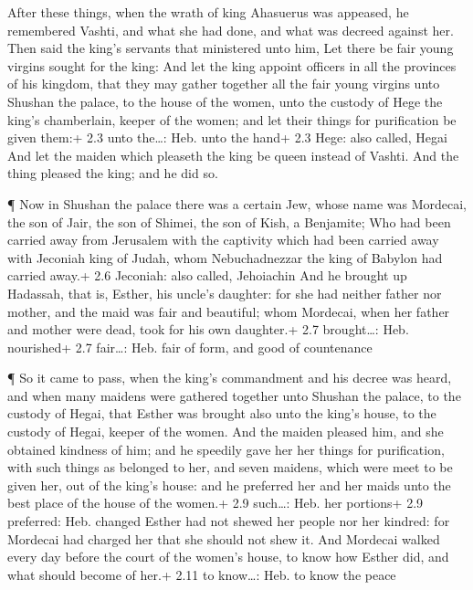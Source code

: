  After these things, when the wrath of king Ahasuerus was
appeased, he remembered Vashti, and what she had done, and what was
decreed against her.  Then said the king's servants that
ministered unto him, Let there be fair young virgins sought for the
king:  And let the king appoint officers in all the
provinces of his kingdom, that they may gather together all the fair
young virgins unto Shushan the palace, to the house of the women, unto
the custody of Hege the king's chamberlain, keeper of the women; and let
their things for purification be given them:+ 2.3 unto the\ldots: Heb.
unto the hand+ 2.3 Hege: also called, Hegai  And let the
maiden which pleaseth the king be queen instead of Vashti. And the thing
pleased the king; and he did so.

 ¶ Now in Shushan the palace there was a certain Jew, whose
name was Mordecai, the son of Jair, the son of Shimei, the son of Kish,
a Benjamite;  Who had been carried away from Jerusalem with
the captivity which had been carried away with Jeconiah king of Judah,
whom Nebuchadnezzar the king of Babylon had carried away.+ 2.6 Jeconiah:
also called, Jehoiachin  And he brought up Hadassah, that
is, Esther, his uncle's daughter: for she had neither father nor mother,
and the maid was fair and beautiful; whom Mordecai, when her father and
mother were dead, took for his own daughter.+ 2.7 brought\ldots: Heb.
nourished+ 2.7 fair\ldots: Heb. fair of form, and good of countenance

 ¶ So it came to pass, when the king's commandment and his
decree was heard, and when many maidens were gathered together unto
Shushan the palace, to the custody of Hegai, that Esther was brought
also unto the king's house, to the custody of Hegai, keeper of the
women.  And the maiden pleased him, and she obtained
kindness of him; and he speedily gave her her things for purification,
with such things as belonged to her, and seven maidens, which were meet
to be given her, out of the king's house: and he preferred her and her
maids unto the best place of the house of the women.+ 2.9 such\ldots:
Heb. her portions+ 2.9 preferred: Heb. changed  Esther had
not shewed her people nor her kindred: for Mordecai had charged her that
she should not shew it.  And Mordecai walked every day
before the court of the women's house, to know how Esther did, and what
should become of her.+ 2.11 to know\ldots: Heb. to know the peace


